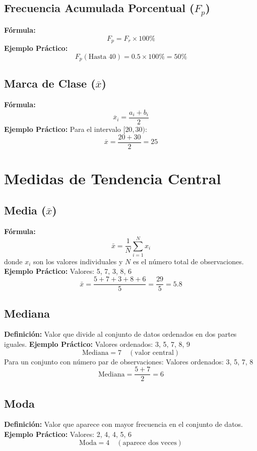 \documentclass[10pt]{article}
\begin{document}
\begin{multicols}{2}
		\subsection*{Frecuencia Acumulada Porcentual ($F_p$)}
		\textbf{Fórmula:}
		\[
		F_p = F_r \times 100\%
		\]
		\textbf{Ejemplo Práctico:}  
		\[
		F_p(\text{Hasta } 40) = 0.5 \times 100\% = 50\%
		\]
		
		\subsection*{Marca de Clase ($\overline{x}$)}
		\textbf{Fórmula:}
		\[
		\overline{x}_i = \frac{a_i + b_i}{2}
		\]
		\textbf{Ejemplo Práctico:}  
		Para el intervalo \([20, 30)\):
		\[
		\overline{x} = \frac{20 + 30}{2} = 25
		\]
		
		\section*{Medidas de Tendencia Central}
		
		\subsection*{Media ($\bar{x}$)}
		\textbf{Fórmula:}
		\[
		\bar{x} = \frac{1}{N} \sum_{i=1}^{N} x_i
		\]
		donde \( x_i \) son los valores individuales y \( N \) es el número total de observaciones.
		\textbf{Ejemplo Práctico:}  
		Valores: 5, 7, 3, 8, 6  
		\[
		\bar{x} = \frac{5 + 7 + 3 + 8 + 6}{5} = \frac{29}{5} = 5.8
		\]
		
		\subsection*{Mediana}
		\textbf{Definición:} Valor que divide al conjunto de datos ordenados en dos partes iguales.
		\textbf{Ejemplo Práctico:}  
		Valores ordenados: 3, 5, 7, 8, 9  
		\[
		\text{Mediana} = 7 \quad (\text{valor central})
		\]
		Para un conjunto con número par de observaciones:  
		Valores ordenados: 3, 5, 7, 8  
		\[
		\text{Mediana} = \frac{5 + 7}{2} = 6
		\]
		
		\subsection*{Moda}
		\textbf{Definición:} Valor que aparece con mayor frecuencia en el conjunto de datos.
		\textbf{Ejemplo Práctico:}  
		Valores: 2, 4, 4, 5, 6  
		\[
		\text{Moda} = 4 \quad (\text{aparece dos veces})
		\]
		

\end{multicols}
\end{document}
